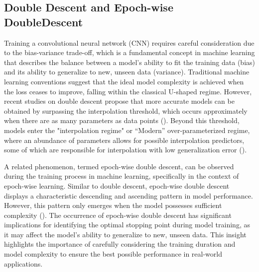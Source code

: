 \subsection{Double Descent and Epoch-wise DoubleDescent}
Training a convolutional neural network (CNN) requires careful consideration due to the bias-variance trade-off, which is a fundamental concept in machine learning that describes the balance between a model's ability to fit the training data (bias) and its ability to generalize to new, unseen data (variance). Traditional machine learning conventions suggest that the ideal model complexity is achieved when the loss ceases to improve, falling within the classical U-shaped regime. However, recent studies on double descent propose that more accurate models can be obtained by surpassing the interpolation threshold, which occurs approximately when there are as many parameters as data points (\cite{Belkin2019ReconcilingTrade-off}). Beyond this threshold, models enter the "interpolation regime" or “Modern” over-parameterized regime, where an abundance of parameters allows for possible interpolation predictors, some of which are responsible for interpolation with low generalization error (\cite{Belkin2021FitInterpolation}).

A related phenomenon, termed epoch-wise double descent, can be observed during the training process in machine learning, specifically in the context of epoch-wise learning. Similar to double descent, epoch-wise double descent displays a characteristic descending and ascending pattern in model performance. However, this pattern only emerges when the model possesses sufficient complexity (\cite{Nakkiran2021DeepHurt, Stephenson2021WhenHappens}). The occurrence of epoch-wise double descent has significant implications for identifying the optimal stopping point during model training, as it may affect the model's ability to generalize to new, unseen data. This insight highlights the importance of carefully considering the training duration and model complexity to ensure the best possible performance in real-world applications.

